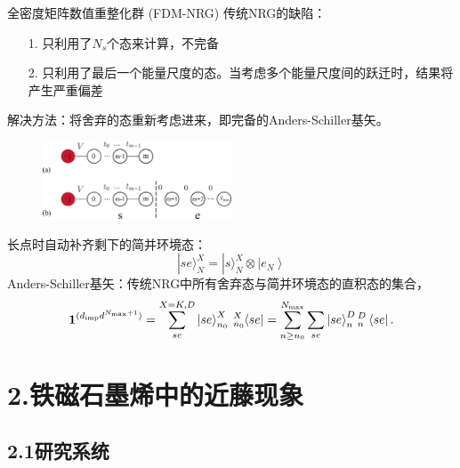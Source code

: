 \documentclass[9pt,t]{beamer} %
\begin{document}
\begin{frame}{全密度矩阵数值重整化群 (FDM-NRG)}
传统NRG的缺陷：
\begin{itemize}
\setlength\itemsep{0.4em}
\item[1.] 只利用了$N_{s}$个态来计算，不完备
\item[2.] 只利用了最后一个能量尺度的态。当考虑多个能量尺度间的跃迁时，结果将产生严重偏差
\end{itemize}
解决方法：将舍弃的态重新考虑进来，即完备的Anders-Schiller基矢。
\begin{figure}
\includegraphics[width=0.5\textwidth]{chain-split.png}
\end{figure}
长点时自动补齐剩下的简并环境态：
\[
|s e\rangle_{N}^{X}=|s\rangle_{N}^{X} \otimes\left|e_{N}\right\rangle
\]
Anders-Schiller基矢：传统NRG中所有舍弃态与简并环境态的直积态的集合，
\begin{equation}\nonumber
\boldsymbol{1}^{(d_{\rm{imp}} d^{N_{\rm{max}}+1})} = \sum_{se}^{X=K,D} \ket{se}_{n_0}^X\hspace{0.8mm}{}_{n_0}^X \hspace{-0.8mm} \bra{se} = \sum_{n\geq n_0}^{N_{\rm{max}}} \sum_{se} \ket{se}_n^D {}_n^{\hspace{0.0mm} D} \bra{se}.
\end{equation}
\end{frame}

\section{2.铁磁石墨烯中的近藤现象}
\subsection{2.1研究系统}
\begin{frame}
\tableofcontents[currentsection] 
\end{frame}
\end{document}
